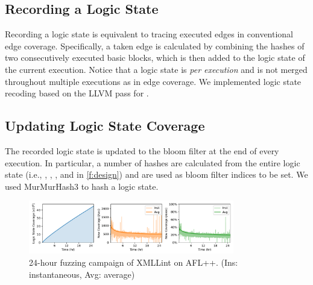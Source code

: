 \documentclass[letterpaper,twocolumn,10pt]{article}
\begin{document}
\subsection{Recording a Logic State}
\label{s:design:rec}


Recording a logic state is equivalent to tracing executed edges in conventional
edge coverage. Specifically, a taken edge is calculated by combining the
hashes of two consecutively executed basic blocks, which is then added to the
logic state of the current execution. Notice that a logic state is \textit{per
execution} and is not merged throughout multiple executions as in edge
coverage. We implemented logic state recoding based on the LLVM pass for
 \cite{afl}.

\subsection{Updating Logic State Coverage}
\label{s:design:up}


The recorded logic state is updated to the bloom filter at the end of every
execution. In particular, a number of hashes are calculated from the entire
logic state (i.e., , , , and  in \autoref{f:design}) and
are used as bloom filter indices to be set. We used MurMurHash3
\cite{murmurhash3} to hash a logic state.

\begin{figure}[t]
  \centering
  \includegraphics[width=0.8\textwidth]{images/aflpp-xmllint-epfl.pdf}
  \caption{24-hour fuzzing campaign of XMLLint on AFL++. (Ins: instantaneous,
    Avg: average)}
  \label{f:aflpp-xmllint-epfl}
\end{figure}
\end{document}
